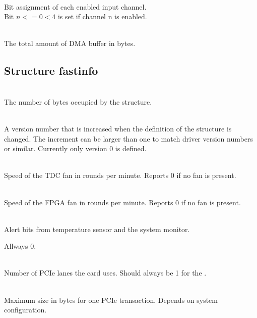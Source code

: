 			\\
			Bit assignment of each enabled input channel.\\
			Bit $n <= 0 < 4$ is set if channel n is enabled. \par

			\\
			The total amount of DMA buffer in bytes.

		\subsection{Structure \prefix fast\tu info}

			\\
			The number of bytes occupied by the structure. \par

			\\
			A version number that is increased when the definition of the structure is changed. The increment can be larger than one to match driver version numbers or similar. Currently only version 0 is defined.\par


			\\
			Speed of the TDC fan in rounds per minute. Reports 0 if no fan is present.\par

			\\
			Speed of the FPGA fan in rounds per minute. Reports 0 if no fan is present.\par

			\\
			Alert bits from temperature sensor and the system monitor.
			\par

			Allways 0. \par

			\\
			Number of PCIe lanes the card uses. Should always be 1 for the \deviceName. \par

			\\
			Maximum size in bytes for one PCIe transaction. Depends on system configuration.\par

